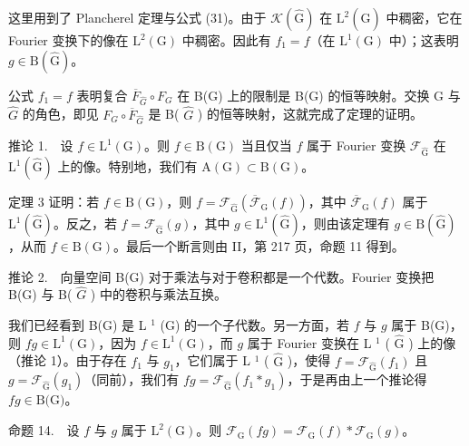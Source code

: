 这里用到了 Plancherel 定理与公式 (31)。由于 \(\mathcal{K}(\widehat{\mathrm{G}})\) 在 \(\mathrm{L}^2 (\widehat{\mathrm{G}})\) 中稠密，它在 Fourier 变换下的像在 \(\mathrm{L}^2 (\mathrm{G})\) 中稠密。因此有 \(f_{1} = f\)（在 \(\mathrm{L}^{1}(\mathrm{G})\) 中）；这表明 \(g\in \mathrm{B}(\widehat{\mathrm{G}})\)。

公式 \(f_{1}=f\) 表明复合 \(\overline{F}_{\widehat{G}}\circ F_{G}\) 在 B(G) 上的限制是 B(G) 的恒等映射。交换 G 与 \(\widehat{G}\) 的角色，即见 \(F_{G}\circ\overline{F}_{\widehat{G}}\) 是 B( \(\widehat{G}\) ) 的恒等映射，这就完成了定理的证明。

推论 1.　设 \(f \in \mathrm{L}^{1}(\mathrm{G})\)。则 \(f \in \mathrm{B}(\mathrm{G})\) 当且仅当 \(f\) 属于 Fourier 变换 \(\mathcal{F}_{\widehat{\mathrm{G}}}\) 在 \(\mathrm{L}^{1}(\widehat{\mathrm{G}})\) 上的像。特别地，我们有 \(\mathrm{A}(\mathrm{G}) \subset \mathrm{B}(\mathrm{G})\)。

定理 3 证明：若 \(f \in \mathrm{B}(\mathrm{G})\)，则 \(f = \mathcal{F}_{\widehat{\mathrm{G}}}(\overline{\mathcal{F}}_{\mathrm{G}}(f))\)，其中 \(\overline{\mathcal{F}}_{\mathrm{G}}(f)\) 属于 \(\mathrm{L}^1(\widehat{\mathrm{G}})\)。反之，若 \(f = \mathcal{F}_{\widehat{\mathrm{G}}}(g)\)，其中 \(g \in \mathrm{L}^1(\widehat{\mathrm{G}})\)，则由该定理有 \(g \in \mathrm{B}(\widehat{\mathrm{G}})\)，从而 \(f \in \mathrm{B}(\mathrm{G})\)。最后一个断言则由 II，第 217 页，命题 11 得到。

推论 2.　向量空间 B(G) 对于乘法与对于卷积都是一个代数。Fourier 变换把 B(G) 与 B( \(\widehat{G}\) ) 中的卷积与乘法互换。

我们已经看到 B(G) 是 L \(^{1}\) (G) 的一个子代数。另一方面，若 \(f\) 与 \(g\) 属于 B(G)，则 \(fg \in \text{L}^{1}(\text{G})\)，因为 \(f \in \text{L}^{1}(\text{G})\)，而 \(g\) 属于 Fourier 变换在 L \(^{1}\) ( \(\widehat{\text{G}}\) ) 上的像（推论 1）。由于存在 \(f_{1}\) 与 \(g_{1}\)，它们属于 L \(^{1}\) ( \(\widehat{\text{G}}\) )，使得 \(f = \mathcal{F}_{\widehat{\text{G}}} (f_{1})\) 且 \(g = \mathcal{F}_{\widehat{\text{G}}} (g_{1})\)（同前），我们有 \(fg = \mathcal{F}_{\widehat{\text{G}}} (f_{1} * g_{1})\)，于是再由上一个推论得 \(fg \in \text{B(G)}\)。

命题 14.　设 \(f\) 与 \(g\) 属于 \(\mathrm{L}^2 (\mathrm{G})\)。则 \(\mathcal{F}_{\mathrm{G}}(fg) = \mathcal{F}_{\mathrm{G}}(f)*\mathcal{F}_{\mathrm{G}}(g)\)。

